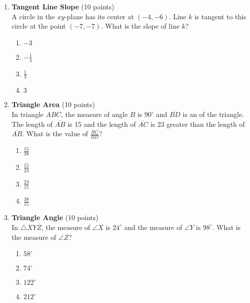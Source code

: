 \begin{enumerate}
  \newpage

  \item \textbf{Tangent Line Slope} (10 points)\\
  A circle in the $xy$-plane has its center at $(-4,-6)$. Line $k$ is tangent to this circle at the point $(-7,-7)$. What is the slope of line $k$?\\
  \begin{enumerate}[label=(\Alph*)]
    \item $-3$
    \item $-\frac{1}{3}$
    \item $\frac{1}{3}$
    \item $3$
  \end{enumerate}
  \begin{subanswer}
  \end{subanswer}

  \item \textbf{Triangle Area} (10 points)\\
  In triangle $A B C$, the measure of angle $B$ is $90^{\circ}$ and 
  $\overline{B D}$ is an  of the triangle. The length of 
  $\overline{A B}$ is 15 and the length of $\overline{A C}$ is 23 
  greater than the length of $\overline{A B}$. What is the value of $\frac{B C}{B D}$?\\
  \begin{enumerate}[label=(\Alph*)]
    \item $\frac{15}{38}$
    \item $\frac{15}{23}$
    \item $\frac{23}{15}$
    \item $\frac{38}{15}$
  \end{enumerate}
  \begin{subanswer}
  \end{subanswer}

  \newpage

  \item \textbf{Triangle Angle} (10 points)\\
  In $\triangle X Y Z$, the measure of $\angle X$ is $24^{\circ}$ and the measure of $\angle Y$ is $98^{\circ}$. What is the measure of $\angle Z$?\\
  \begin{enumerate}[label=(\Alph*)]
    \item $58^{\circ}$
    \item $74^{\circ}$
    \item $122^{\circ}$
    \item $212^{\circ}$
  \end{enumerate}
  \begin{subanswer}
  \end{subanswer}


\end{enumerate}
